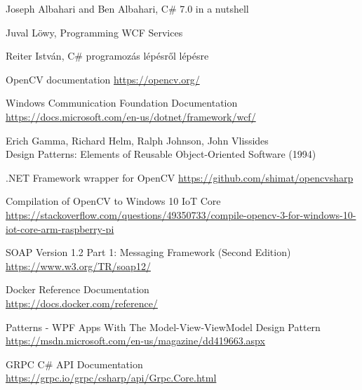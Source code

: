 \begin{thebibliography}{4}

 Joseph Albahari and Ben Albahari, C\# 7.0 in a nutshell 

 Juval Löwy, Programming WCF Services

 Reiter István, C\# programozás lépésről lépésre 

 OpenCV documentation \url{https://opencv.org/}

 Windows Communication Foundation Documentation \url{https://docs.microsoft.com/en-us/dotnet/framework/wcf/}

 Erich Gamma, Richard Helm, Ralph Johnson, John Vlissides \\
Design Patterns: Elements of Reusable Object-Oriented Software (1994)

 .NET Framework wrapper for OpenCV \url{https://github.com/shimat/opencvsharp}

 Compilation of OpenCV to Windows 10 IoT Core \\ \url{https://stackoverflow.com/questions/49350733/compile-opencv-3-for-windows-10-iot-core-arm-raspberry-pi}

 SOAP Version 1.2 Part 1: Messaging Framework (Second Edition) \\ 
\url{https://www.w3.org/TR/soap12/}

 Docker Reference Documentation \\ \url{https://docs.docker.com/reference/}

 Patterns - WPF Apps With The Model-View-ViewModel Design Pattern \\ \url{https://msdn.microsoft.com/en-us/magazine/dd419663.aspx}

 GRPC C\# API Documentation \\
\url{https://grpc.io/grpc/csharp/api/Grpc.Core.html}
\end{thebibliography}

